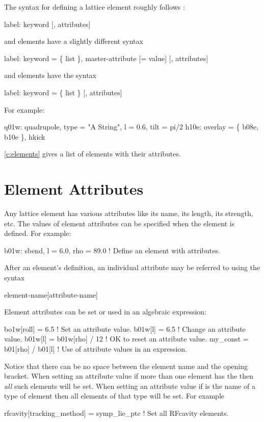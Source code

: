 The syntax for defining a lattice element roughly follows \mad:
\begin{example}
  label: keyword [, attributes]
\end{example}
 and  elements have a slightly different syntax
\begin{example}
  label: keyword = \{ list \}, master-attribute [= value] [, attributes]
\end{example}
and  elements have the syntax
\begin{example}
  label: keyword = \{ list \} [, attributes]
\end{example}  
For example:
\begin{example}
  q01w: quadrupole, type = "A String", l = 0.6, tilt = pi/2
  h10e: overlay = \{ b08e, b10e \}, hkick
\end{example}

\cref{c:elements} gives a list of elements with their attributes.

\section{Element Attributes}

Any lattice element has various attributes like its name, its length,
its strength, etc. The values of element attributes can be specified
when the element is defined. For example:
\begin{example}
  b01w: sbend, l = 6.0, rho = 89.0 ! Define an element with attributes.
\end{example}
After an element's definition, an individual attribute may be referred
to using the syntax
\begin{example}
  element-name[attribute-name]
\end{example}
Element attributes can be set or used in an algebraic expression:
\begin{example}
  bo1w[roll] = 6.5                  ! Set an attribute value.
  b01w[l] = 6.5                     ! Change an attribute value.
  b01w[l] = b01w[rho] / 12          ! OK to reset an attribute value.
  my_const = b01[rho] / b01[l]      ! Use of attribute values in an expression.
\end{example}
Notice that there can be no space between the element name and the
\vn{[} opening bracket.  When setting an attribute value if more than
one element has the  then {\it all} such elements
will be set.  When setting an attribute value if  is
the name of a type of element then all elements of that type will be
set. For example
\begin{example}
  rfcavity[tracking_method] = symp_lie_ptc ! Set all RFcavity elements.
\end{example}

